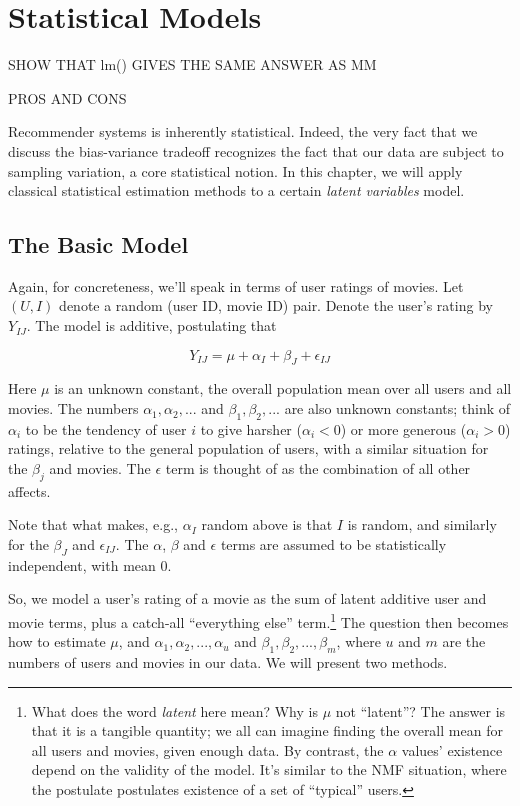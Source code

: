 \chapter{Statistical Models}  
\label{chap:mixed} 

SHOW THAT lm() GIVES THE SAME ANSWER AS MM

PROS AND CONS

Recommender systems is inherently statistical.  Indeed, the very fact
that we discuss the bias-variance tradeoff recognizes the fact that our
data are subject to sampling variation, a core statistical notion.  In
this chapter, we will apply classical statistical estimation methods to
a certain \textit{latent variables} model.

\section{The Basic Model}

Again, for concreteness, we'll speak in terms of user ratings of movies.
Let $(U,I)$ denote a random (user ID, movie ID) pair.  Denote the user's
rating by $Y_{IJ}$.  The model is additive, postulating that

\begin{equation}
Y_{IJ} = \mu + \alpha_I + \beta_J + \epsilon_{IJ}
\end{equation}

Here $\mu$ is an unknown constant, the overall population mean over all
users and all movies.  The numbers $\alpha_1, \alpha_2,...$ and
$\beta_1, \beta_2,...$ are also unknown constants; think of $\alpha_i$
to be the tendency of user $i$ to give harsher ($\alpha_i < 0$) or more
generous ($\alpha_i > 0$) ratings, relative to the general population of
users, with a similar situation for the $\beta_j$ and movies.  The
$\epsilon$ term is thought of as the combination of all other affects.

Note that what makes, e.g., $\alpha_I$ random above is that $I$ is
random, and similarly for the $\beta_J$ and $\epsilon_{IJ}$.  The
$\alpha$, $\beta$ and $\epsilon$ terms are assumed to be statistically
independent, with mean 0.

So, we model a user's rating of a movie as the sum of latent additive
user and movie terms, plus a catch-all ``everything else''
term.\footnote{What does the word \textit{latent} here mean?  Why is
$\mu$ not ``latent''?  The answer is that it is a tangible quantity; we
all can imagine finding the overall mean for all users and movies, given
enough data.  By contrast, the $\alpha$ values' existence depend on the
validity of the model.  It's similar to the NMF situation, where the
postulate postulates existence of a set of ``typical'' users.}  The
question then becomes how to estimate $\mu$, and $\alpha_1,
\alpha_2,...,\alpha_u$ and $\beta_1, \beta_2,...,\beta_m$, where $u$ and
$m$ are the numbers of users and movies in our data.  We will present
two methods.

